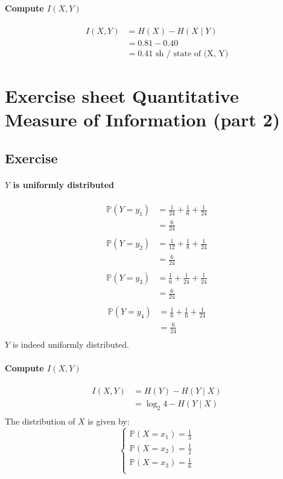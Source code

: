 \documentclass{article}
\newcommand{\1}{\mathbf{1}}
\renewcommand{\P}{\mathbb{P}}
\begin{document}
\paragraph{Compute $I(X, Y)$}
\begin{align*}
  I(X, Y)
   & = H(X) - H(X \mid Y)                \\
   & = 0.81 - 0.40                       \\
   & = 0.41 \text{ sh / state of (X, Y)}
\end{align*}

\section{Exercise sheet Quantitative Measure of Information (part 2)}
\subsection{Exercise}
\paragraph{$Y$ is uniformly distributed}
\begin{align*}
  \P(Y = y_1)
   & = \frac{1}{24} + \frac{1}{6} + \frac{1}{24} \\
   & = \frac{6}{24}                              \\
\end{align*}
\begin{align*}
  \P(Y = y_2)
   & = \frac{1}{12} + \frac{1}{8} + \frac{1}{24} \\
   & = \frac{6}{24}                              \\
\end{align*}
\begin{align*}
  \P(Y = y_3)
   & = \frac{1}{6} + \frac{1}{24} + \frac{1}{24} \\
   & = \frac{6}{24}                              \\
\end{align*}
\begin{align*}
  \P(Y = y_4)
   & = \frac{1}{6} + \frac{1}{6} + \frac{1}{24} \\
   & = \frac{6}{24}                             \\
\end{align*}
$Y$ is indeed uniformly distributed.

\paragraph{Compute $I(X, Y)$}
\begin{align*}
  I(X, Y)
   & = H(Y) - H(Y \mid X)     \\
   & = \log_2 4 - H(Y \mid X) \\
\end{align*}
The distribution of $X$ is given by:
$$
  \begin{cases}
    \P(X = x_1) = \frac{1}{3} \\
    \P(X = x_2) = \frac{1}{2} \\
    \P(X = x_3) = \frac{1}{6} \\
  \end{cases}
$$
\end{document}
